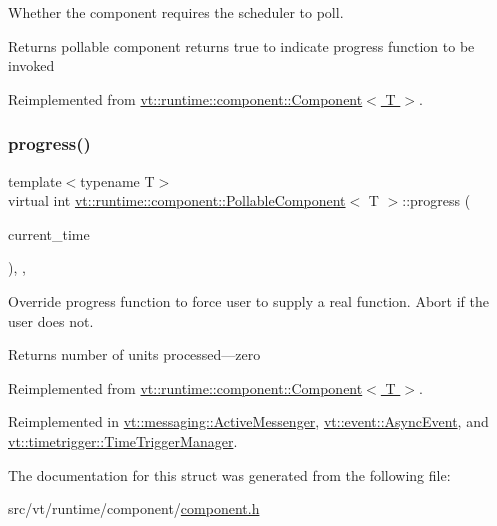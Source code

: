 Whether the component requires the scheduler to poll. 

\begin{DoxyReturn}{Returns}
pollable component returns true to indicate progress function to be invoked 
\end{DoxyReturn}


Reimplemented from \hyperlink{structvt_1_1runtime_1_1component_1_1_component_a5a15bd0369a9d3765a6c70249bada96f}{vt\+::runtime\+::component\+::\+Component$<$ T $>$}.

\mbox{\label{structvt_1_1runtime_1_1component_1_1_pollable_component_a51939e8b7e895a377c10c6767034396b}} 
\subsubsection{\texorpdfstring{progress()}{progress()}}
{\footnotesize\ttfamily template$<$typename T$>$ \\
virtual int \hyperlink{structvt_1_1runtime_1_1component_1_1_pollable_component}{vt\+::runtime\+::component\+::\+Pollable\+Component}$<$ T $>$\+::progress (\begin{DoxyParamCaption}\item[{\hyperlink{namespacevt_a2b9f28078dc309ad0706b69ded743e69}{Time\+Type}}]{current\+\_\+time }\end{DoxyParamCaption})\hspace{0.3cm}{\ttfamily [inline]}, {\ttfamily [override]}, {\ttfamily [virtual]}}



Override progress function to force user to supply a real function. Abort if the user does not. 

\begin{DoxyReturn}{Returns}
number of units processed---zero 
\end{DoxyReturn}


Reimplemented from \hyperlink{structvt_1_1runtime_1_1component_1_1_component_a45e3c09608c2d8d1a7de12e1c3347f1e}{vt\+::runtime\+::component\+::\+Component$<$ T $>$}.



Reimplemented in \hyperlink{structvt_1_1messaging_1_1_active_messenger_a59eadf26776b0adcf46d22d7bddedf4c}{vt\+::messaging\+::\+Active\+Messenger}, \hyperlink{structvt_1_1event_1_1_async_event_aa99cf6ece5deebbe4f43c9d21a78a2aa}{vt\+::event\+::\+Async\+Event}, and \hyperlink{structvt_1_1timetrigger_1_1_time_trigger_manager_a15cc796e1f07dbf32c04b3fb3f3ce06c}{vt\+::timetrigger\+::\+Time\+Trigger\+Manager}.



The documentation for this struct was generated from the following file\+:\begin{DoxyCompactItemize}
\item 
src/vt/runtime/component/\hyperlink{component_8h}{component.\+h}\end{DoxyCompactItemize}
